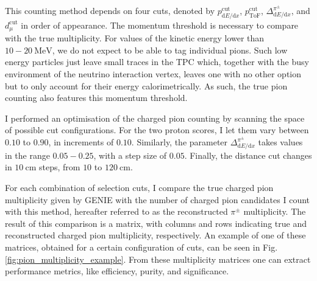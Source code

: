This counting method depends on four cuts, denoted by $p^{\mathrm{cut}}_{\mathrm{d}E/\mathrm{d}x}$, $p^{\mathrm{cut}}_{\mathrm{ToF}}$, $\Delta^{\pi^{\pm}}_{\mathrm{d}E/\mathrm{d}x}$, and $d^{\mathrm{cut}}_{\mu}$ in order of appearance. The momentum threshold is necessary to compare with the true multiplicity. For values of the kinetic energy lower than $10-20~\mathrm{MeV}$, we do not expect to be able to tag individual pions. Such low energy particles just leave small traces in the TPC which, together with the busy environment of the neutrino interaction vertex, leaves one with no other option but to only account for their energy calorimetrically. As such, the true pion counting also features this momentum threshold.

I performed an optimisation of the charged pion counting by scanning the space of possible cut configurations. For the two proton scores, I let them vary between $0.10$ to $0.90$, in increments of $0.10$. Similarly, the parameter $\Delta^{\pi^{\pm}}_{\mathrm{d}E/\mathrm{d}x}$ takes values in the range $0.05-0.25$, with a step size of $0.05$. Finally, the distance cut changes in $10~\mathrm{cm}$ steps, from $10$ to $120~\mathrm{cm}$.

For each combination of selection cuts, I compare the true charged pion multiplicity given by GENIE with the number of charged pion candidates I count with this method, hereafter referred to as the reconstructed $\pi^{\pm}$ multiplicity. The result of this comparison is a matrix, with columns and rows indicating true and reconstructed charged pion multiplicity, respectively. An example of one of these matrices, obtained for a certain configuration of cuts, can be seen in Fig. \ref{fig:pion_multiplicity_example}. From these multiplicity matrices one can extract performance metrics, like efficiency, purity, and significance.

